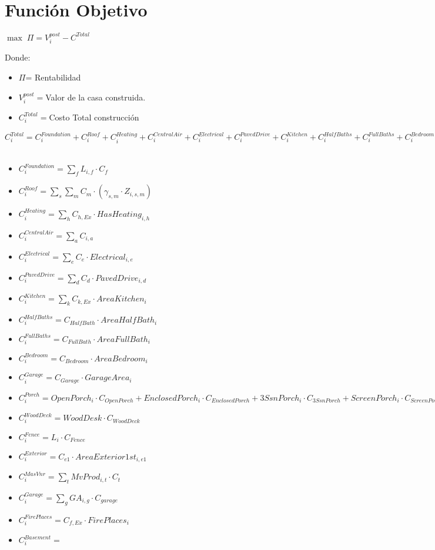 \documentclass{article}
\begin{document}
\section{Función Objetivo}
\begin{center}
    $\max \; \Pi = V_{i}^{post} - C^{Total}$
\end{center}
Donde:\\
\begin{itemize}
    \item $\Pi$= Rentabilidad
    \item $V_{i}^{post}=$Valor de la casa construida.
    \item $C_{i}^{Total}=$Costo Total construcción
\end{itemize}
$C_{i}^{Total}=C_{i}^{Foundation}+C_i^{Roof}+C_{i}^{Heating}+C_{i}^{CentralAir}+C_{i}^{Electrical}+C_{i}^{PavedDrive}+C_{i}^{Kitchen}+C_{i}^{HalfBaths}+C_{i}^{FullBaths}+C_{i}^{Bedroom}+C_{i}^{Garage}+C_{i}^{Porch}+C_{i}^{WoodDeck}+C_{i}^{Reja} + C{i}^{Basement}+C_{i}^{MasVnr}+C_{i}^{Exterior}+C_{i}^{MiscFeature} +C_{i}^{FirePlaces}$\\
\\
\begin{itemize}
    \item $C_{i}^{Foundation}=\sum _{f} L_{i,f}\cdot C_{f}$
    \item $C_i^{Roof}= \sum_{s} \sum_{m} C_{m}\cdot (\gamma_{s,m}\cdot Z_{i,s,m})$
    \item $C_{i}^{Heating}=\sum_{h} C_{h,Ex}\cdot HasHeating_{i,h}$
    \item $C_{i}^{CentralAir}= \sum_{a} C_{i,a}$
    \item $C_{i}^{Electrical}=\sum_{e} C_{e} \cdot Electrical_{i,e}$
    \item $C_{i}^{PavedDrive}= \sum_{d} C_{d}\cdot PavedDrive_{i,d}$
    \item $C_{i}^{Kitchen}=\sum_{k}C_{k,Ex}\cdot AreaKitchen_{i}$
    \item $C_{i}^{HalfBaths}= C_{HalfBath}\cdot AreaHalfBath_{i}$
    \item $C_{i}^{FullBaths}= C_{FullBath}\cdot AreaFullBath_{i}$
    \item $C_{i}^{Bedroom}= C_{Bedroom}\cdot AreaBedroom_{i}$
    \item $C_{i}^{Garage}=C_{Garage}\cdot GarageArea_{i}$
    \item $C_{i}^{Porch}= OpenPorch_{i}\cdot C_{OpenPorch}+EnclosedPorch_{i}\cdot C_{EnclosedPorch}+3SsnPorch_{i}\cdot C_{3SsnPorch}+ScreenPorch_{i} \cdot C_{ScreenPorch}$
    \item $C_{i}^{WoodDeck}=WoodDesk\cdot C_{WoodDeck}$
    \item $C_{i}^{Fence}=L_{i}\cdot C_{Fence}$
    \item $C_{i}^{Exterior}=C_{e1} \cdot AreaExterior1st_{i,e1}$
    \item $C_i^{MasVnr}=\sum _{t}MvProd_{i,t}\cdot C_{t}$
    \item $C_{i}^{Garage}= \sum_{g} GA_{i,g}\cdot C_{garage}$
    \item $C_{i}^{FirePlaces}=C_{f,Ex}\cdot FirePlaces_{i}$
    \item $C_{i}^{Basement}=$
\end{itemize}
\end{document}
